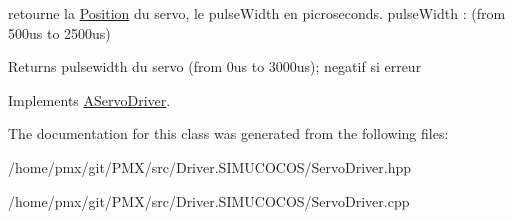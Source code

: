 retourne la \hyperlink{structPosition}{Position} du servo, le pulse\+Width en picroseconds. pulse\+Width \+: (from 500us to 2500us) 

\begin{DoxyReturn}{Returns}
pulsewidth du servo (from 0us to 3000us); negatif si erreur 
\end{DoxyReturn}


Implements \hyperlink{classAServoDriver}{A\+Servo\+Driver}.



The documentation for this class was generated from the following files\+:\begin{DoxyCompactItemize}
\item 
/home/pmx/git/\+P\+M\+X/src/\+Driver.\+S\+I\+M\+U\+C\+O\+C\+O\+S/Servo\+Driver.\+hpp\item 
/home/pmx/git/\+P\+M\+X/src/\+Driver.\+S\+I\+M\+U\+C\+O\+C\+O\+S/Servo\+Driver.\+cpp\end{DoxyCompactItemize}
